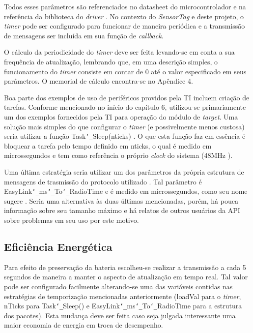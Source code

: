 Todos esses parâmetros são referenciados no datasheet do microcontrolador \cite{datasheet} e na referência da biblioteca do \emph{driver} \cite{gptimer}. No contexto do \emph{SensorTag} e deste projeto, o \emph{timer} pode ser configurado para funcionar de maneira periódica e a transmissão de mensagens ser incluída em sua função de \emph{callback}.

O cálculo da periodicidade do \emph{timer} deve ser feita levando-se em conta a sua frequência de atualização, lembrando que, em uma descrição simples, o funcionamento do \emph{timer} consiste em contar de 0 até o valor especificado em seus parâmetros. O memorial de cálculo encontra-se no Apêndice 4.

Boa parte dos exemplos de uso de periféricos providos pela TI incluem criação de tarefas. Conforme mencionado no início do capítulo 6, utilizou-se primariamente um dos exemplos fornecidos pela TI para operação do módulo de \emph{target}. Uma solução mais simples do que configurar o \emph{timer} (e possivelmente menos custosa) seria utilizar a função Task\texttt{\char`_}Sleep(nticks) \cite{task-modules}. O que esta função faz em essência é bloquear a tarefa pelo tempo definido em nticks, o qual é medido em microssegundos e tem como referência o próprio \emph{clock} do sistema (48MHz \cite{datasheet}).

Uma última estratégia seria utilizar um dos parâmetros da própria estrutura de mensagens de trasmissão do protocolo utilizado \cite{forum-easylink}. Tal parâmetro é EasyLink\texttt{\char`_}ms\texttt{\char`_}To\texttt{\char`_}RadioTime e é medido em microssegundos, como seu nome sugere \cite{easylink}. Seria uma alternativa às duas últimas mencionadas, porém, há pouca informação sobre seu tamanho máximo e há relatos de outros usuários da API sobre problemas em seu uso por este motivo.

\subsection{Eficiência Energética}

Para efeito de preservação da bateria escolheu-se realizar a transmissão a cada 5 segundos de maneira a manter o aspecto de atualização em tempo real. Tal valor pode ser configurado facilmente alterando-se uma das variáveis contidas nas estratégias de temporização mencionadas anteriormente (loadVal para o \emph{timer}, nTicks para Task\texttt{\char`_}Sleep() e EasyLink\texttt{\char`_}ms\texttt{\char`_}To\texttt{\char`_}RadioTime para a estrutura dos pacotes). Esta mudança deve ser feita caso seja julgada interessante uma maior economia de energia em troca de desempenho.

